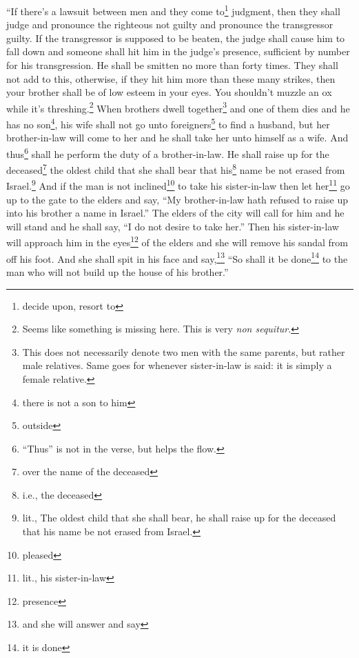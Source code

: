
\begin{inparaenum}
     ``If there's a lawsuit between men and they come to\footnote{decide upon, resort to} judgment, then they shall judge and pronounce the righteous not guilty and pronounce the transgressor guilty.%
     If the transgressor is supposed to be beaten, the judge shall cause him to fall down and someone shall hit him in the judge's presence, sufficient by number for his transgression.%
     He shall be smitten no more than forty times. They shall not add to this, otherwise, if they hit him more than these many strikes, then your brother shall be of low esteem in your eyes.%
     You shouldn't muzzle an ox while it's threshing.\footnote{Seems like something is missing here. This is very \textit{non sequitur}.}%
     When brothers dwell together\footnote{This does not necessarily denote two men with the same parents, but rather male relatives. Same goes for whenever sister-in-law is said: it is simply a female relative.} and one of them dies and he has no son\footnote{there is not a son to him}, his wife shall not go unto foreigners\footnote{outside} to find a husband, but her brother-in-law will come to her and he shall take her unto himself as a wife. And thus\footnote{``Thus'' is not in the verse, but helps the flow.} shall he perform the duty of a brother-in-law.%
     He shall raise up for the deceased\footnote{over the name of the deceased} the oldest child that she shall bear that his\footnote{i.e., the deceased} name be not erased from Israel.\footnote{lit., The oldest child that she shall bear, he shall raise up for the deceased that his name be not erased from Israel.}%
     And if the man is not inclined\footnote{pleased} to take his sister-in-law then let her\footnote{lit., his sister-in-law} go up to the gate to the elders and say, ``My brother-in-law hath refused to raise up into his brother a name in Israel.''%
     The elders of the city will call for him and he will stand and he shall say, ``I do not desire to take her.''%
     Then his sister-in-law will approach him in the eyes\footnote{presence} of the elders and she will remove his sandal from off his foot. And she shall spit in his face and say,\footnote{and she will answer and say} ``So shall it be done\footnote{it is done} to the man who will not build up the house of his brother.''%

\end{inparaenum}
